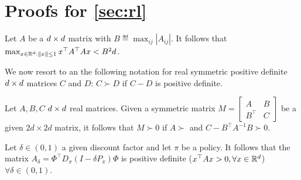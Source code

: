 \section{Proofs for \cref{sec:rl}}

\begin{lemma}\label{lm:matnorm}
Let $A$ be a $d \times d$ matrix with $B\eqdef\max_{ij}\left|A_{ij}\right|$. It follows that $\max_{x\in \mathbb{R}^d: \left\| x\right\|\leq1}x^\top A^\top A x <B^2d$.
\end{lemma}

We now resort to an the following notation for real symmetric positive definite $d \times d$ matrices $C$ and $D$: $C\succ D$ if $C-D$ is positive definite.
\begin{lemma}\label{lm:schur}
Let $A,B,C$ $d \times d$ real matrices. Given a symmetric matrix $M=\left[\begin{matrix}A&B \\B^\top &C\end{matrix}\right]$ be a given $2d\times 2d$ matrix, it follows that $M\succ 0$ if	$A\succ$ and $C-B^\top A^{-1}B\succ 0$.
\end{lemma}

\begin{lemma}\label{lm:amat}
Let $\delta\in(0,1)$ a given discount factor and let $\pi$ be a policy. It follows that the matrix $A_\delta=\Phi^\top D_\pi(I-\delta P_\pi)\Phi$ is positive definite ($x^\top Ax>0,\forall x \in \mathbb{R}^d$) $\forall \delta\in(0,1)$.
\end{lemma}

